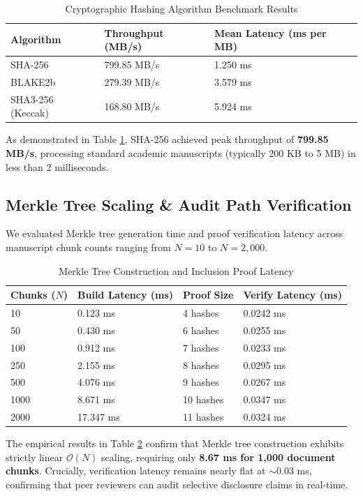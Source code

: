\documentclass[conference]{IEEEtran}
\begin{document}
\begin{table}[h]
\centering
\caption{Cryptographic Hashing Algorithm Benchmark Results}
\label{tab:hashing}
\begin{tabular}{@{}lll@{}}
\toprule
\textbf{Algorithm} & \textbf{Throughput (MB/s)} & \textbf{Mean Latency (ms per MB)} \\ \midrule
SHA-256 & 799.85 MB/s & 1.250 ms \\
BLAKE2b & 279.39 MB/s & 3.579 ms \\
SHA3-256 (Keccak) & 168.80 MB/s & 5.924 ms \\ \bottomrule
\end{tabular}
\end{table}

As demonstrated in Table \ref{tab:hashing}, SHA-256 achieved peak throughput of \textbf{799.85 MB/s}, processing standard academic manuscripts (typically 200 KB to 5 MB) in less than 2 milliseconds.

\subsection{Merkle Tree Scaling \& Audit Path Verification}
We evaluated Merkle tree generation time and proof verification latency across manuscript chunk counts ranging from $N = 10$ to $N = 2,000$.

\begin{table}[h]
\centering
\caption{Merkle Tree Construction and Inclusion Proof Latency}
\label{tab:merkle}
\begin{tabular}{@{}llll@{}}
\toprule
\textbf{Chunks ($N$)} & \textbf{Build Latency (ms)} & \textbf{Proof Size} & \textbf{Verify Latency (ms)} \\ \midrule
10 & 0.123 ms & 4 hashes & 0.0242 ms \\
50 & 0.430 ms & 6 hashes & 0.0255 ms \\
100 & 0.912 ms & 7 hashes & 0.0233 ms \\
250 & 2.155 ms & 8 hashes & 0.0295 ms \\
500 & 4.076 ms & 9 hashes & 0.0267 ms \\
1000 & 8.671 ms & 10 hashes & 0.0347 ms \\
2000 & 17.347 ms & 11 hashes & 0.0324 ms \\ \bottomrule
\end{tabular}
\end{table}

The empirical results in Table \ref{tab:merkle} confirm that Merkle tree construction exhibits strictly linear $\mathcal{O}(N)$ scaling, requiring only \textbf{8.67 ms for 1,000 document chunks}. Crucially, verification latency remains nearly flat at $\sim 0.03$ ms, confirming that peer reviewers can audit selective disclosure claims in real-time.
\end{document}
